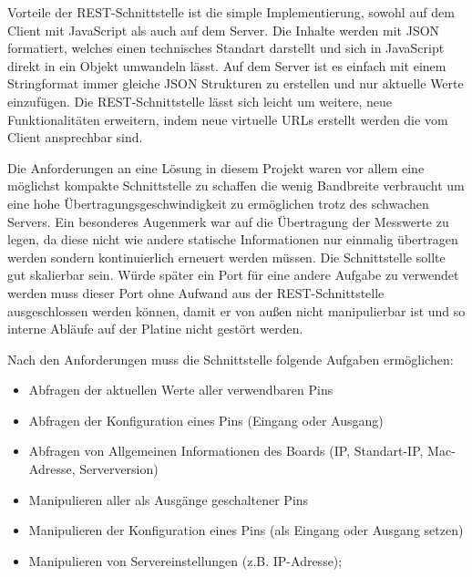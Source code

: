 Vorteile der REST-Schnittstelle ist die simple Implementierung, sowohl auf dem Client mit
JavaScript als auch auf dem Server. Die Inhalte werden mit JSON formatiert, welches einen
technisches Standart darstellt und sich in JavaScript direkt in ein Objekt umwandeln
lässt. Auf dem Server ist es einfach mit einem Stringformat immer gleiche JSON Strukturen
zu erstellen und nur aktuelle Werte einzufügen. Die REST-Schnittstelle lässt sich leicht
um weitere, neue Funktionalitäten erweitern, indem neue virtuelle URLs erstellt werden die
vom Client ansprechbar sind.

Die Anforderungen an eine Lösung in diesem Projekt waren vor allem eine möglichst kompakte
Schnittstelle zu schaffen die wenig Bandbreite verbraucht um eine hohe
Übertragungsgeschwindigkeit zu ermöglichen trotz des schwachen Servers. Ein besonderes
Augenmerk war auf die Übertragung der Messwerte zu legen, da diese nicht wie andere
statische Informationen nur einmalig übertragen werden sondern kontinuierlich erneuert
werden müssen. Die Schnittstelle sollte gut skalierbar sein. Würde später ein Port für
eine andere Aufgabe zu verwendet werden muss dieser Port ohne Aufwand aus der
REST-Schnittstelle ausgeschlossen werden können, damit er von außen nicht manipulierbar
ist und so interne Abläufe auf der Platine nicht gestört werden.

Nach den Anforderungen muss die Schnittstelle folgende Aufgaben ermöglichen:
\begin{itemize}
  \item Abfragen der aktuellen Werte aller verwendbaren Pins
  \item Abfragen der Konfiguration eines Pins (Eingang oder Ausgang)
  \item Abfragen von Allgemeinen Informationen des Boards (IP, Standart-IP, Mac-Adresse,
  Serverversion)
  \item Manipulieren aller als Ausgänge geschaltener Pins
  \item Manipulieren der Konfiguration eines Pins (als Eingang oder Ausgang setzen)
  \item Manipulieren von Servereinstellungen (z.B. IP-Adresse);
\end{itemize}

